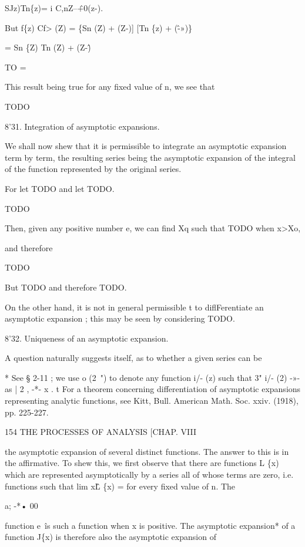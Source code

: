 SJz)Tn\{z)= i C,nZ--\^+0(z-). 

But f\{z) Cf> (Z) = \{Sn (Z) + (Z-)] [Tn \{z) + (\^-»)\} 

= Sn \{Z) Tn (Z) + (Z-\^) 

TO = 

This result being true for any fixed value of n, we see that 

TODO

8'31. Integration of asymptotic expansions. 

We shall now shew that it is permissible to integrate an asymptotic 
expansion term by term, the resulting series being the asymptotic expansion 
of the integral of the function represented by the original series. 

For let TODO and let TODO.

TODO

Then, given any positive number e, we can find Xq such that 
TODO when x>Xo, 



and therefore 

TODO

But TODO
and therefore TODO.

On the other hand, it is not in general permissible t to diflFerentiate an asymptotic 
expansion ; this may be seen by considering TODO. 

8'32. Uniqueness of an asymptotic expansion. 

A question naturally suggests itself, as to whether a given series can be 

* See § 2-11 ; we use o (2~") to denote any function i/- (z) such that 3" i/- (2) -»- as | 2 , -*- x . 
t For a theorem concerning differentiation of asymptotic expansions representing analytic 
functions, see Kitt, Bull. American Math. Soc. xxiv. (1918), pp. 225-227. 



154 THE PROCESSES OF ANALYSIS [CHAP. VIII 

the asymptotic expansion of several distinct functions. The answer to this 
is in the affirmative. To shew this, we first observe that there are functions 
L \{x) which are represented asymptotically by a series all of whose terms are 
zero, i.e. functions such that lim x\^L \{x) = for every fixed value of n. The 

a; -*• 00 

function e~\^ is such a function when x is positive. The asymptotic expansion* 
of a function J\{x) is therefore also the asymptotic expansion of 

